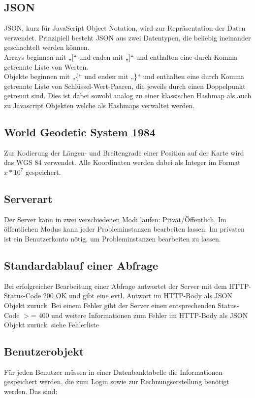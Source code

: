 \documentclass[ngerman,titlepage,parskip=true]{scrartcl}
\begin{document}
	\subsection{JSON}
	 
	JSON, kurz für JavaScript Object Notation, wird zur Repräsentation der Daten verwendet.
	Prinzipiell besteht JSON aus zwei Datentypen, die beliebig ineinander geschachtelt werden können. \\
	Arrays beginnen mit „[“ und enden mit „]“ und enthalten eine durch Komma getrennte Liste von Werten. \\
	Objekte beginnen mit „\{“ und enden mit „\}“ und enthalten eine durch Komma getrennte Liste von Schlüssel-Wert-Paaren, die jeweils durch einen Doppelpunkt getrennt sind.
	Dies ist dabei sowohl analog zu einer klassischen Hashmap als auch zu Javascript Objekten welche als Hashmaps verwaltet werden.
	
	\subsection{World Geodetic System 1984}
	
	Zur Kodierung der Längen- und Breitengrade einer Position auf der Karte wird das WGS 84 verwendet. Alle Koordinaten werden dabei als Integer im Format $x*10^7$ gespeichert.
	
	\subsection*{Serverart}
	Der Server kann in zwei verschiedenen Modi laufen: Privat/Öffentlich. Im öffentlichen Modus kann jeder Probleminstanzen bearbeiten lassen. Im privaten ist ein Benutzerkonto nötig, um Probleminstanzen bearbeiten zu lassen.
	
	\subsection{Standardablauf einer Abfrage}
	Bei erfolgreicher Bearbeitung einer Abfrage antwortet der Server mit dem HTTP-Status-Code 200 OK und gibt eine evtl. Antwort im HTTP-Body als JSON Objekt zurück. Bei einem Fehler gibt der Server einen entsprechenden Status-Code $>$= 400 und weitere Informationen zum Fehler im HTTP-Body als JSON Objekt zurück. siehe Fehlerliste %


	\subsection{Benutzerobjekt}
	\label{benutzerobjekt}
	Für jeden Benutzer müssen in einer Datenbanktabelle die Informationen gespeichert werden, die zum Login sowie zur Rechnungserstellung benötigt werden. 
	Das sind:
	
\end{document}
